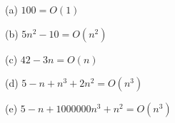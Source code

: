 (a) $100 = O(1)$

(b) $5n^2 - 10 = O(n^2)$

(c) $42 - 3n = O(n)$

(d) $5 - n + n^3 + 2n^2 = O(n^3)$

(e) $5 - n + 1000000n^3 + n^2 = O(n^3)$
